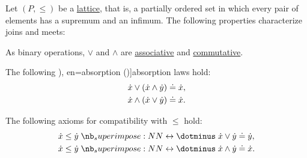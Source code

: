 \begin{proposition}\label{thm:lattice_operation_characterization}
  Let \( (P, \leq) \) be a \hyperref[def:lattice]{lattice}, that is, a partially ordered set in which every pair of elements has a supremum and an infimum. The following properties characterize joins and meets:

  \begin{thmenum}
     As binary operations, \( \vee \) and \( \wedge \) are \hyperref[def:binary_operation/associative]{associative} and \hyperref[def:binary_operation/commutative]{commutative}.

     The following \term[ru=поглощение (\cite[def. 1.1]{КравченкоШвидефски2019ОбщаяАлгебра}), en=absorption (\cite[8]{Birkhoff1967Lattices})]{absorption} laws hold:
    \begin{align}
      {\dot{x}} \vee ({\dot{x}} \wedge {\dot{y}}) &\doteq {\dot{x}}, \label{eq:thm:lattice_operation_characterization/absorption/join} \\
      {\dot{x}} \wedge ({\dot{x}} \vee {\dot{y}}) &\doteq {\dot{x}}. \label{eq:thm:lattice_operation_characterization/absorption/meet}
    \end{align}

     The following axioms for compatibility with \( \leq \) hold:
    \begin{align}
      \synx \leq \syny &\syniff \synx \vee \syny \syneq \syny, \label{eq:thm:lattice_operation_characterization/compatibility/join} \\
      \synx \leq \syny &\syniff \synx \wedge \syny \syneq \synx. \label{eq:thm:lattice_operation_characterization/compatibility/meet}
    \end{align}
  \end{thmenum}
\end{proposition}
